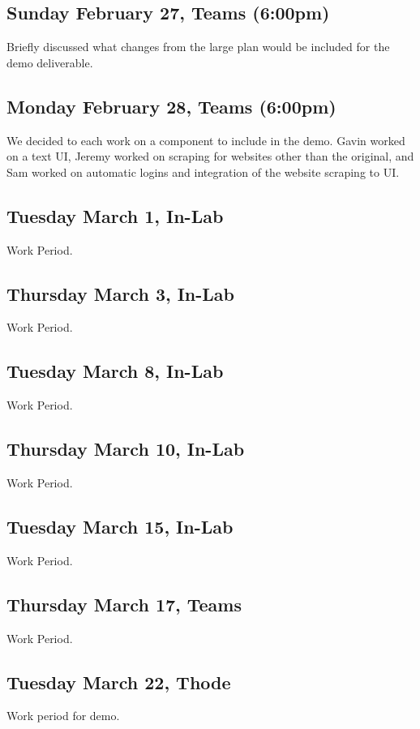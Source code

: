 \documentclass{article}
\begin{document}
\subsection{Sunday February 27, Teams (6:00pm)}
Briefly discussed what changes from the large plan would be included for the demo deliverable. 

\subsection{Monday February 28, Teams (6:00pm)}
We decided to each work on a component to include in the demo. Gavin worked on a text UI, Jeremy worked on scraping for websites other than the original, and Sam worked on automatic logins and integration of the website scraping to UI.

\subsection{Tuesday March 1, In-Lab}
Work Period. 

\subsection{Thursday March 3, In-Lab}
Work Period. 

\subsection{Tuesday March 8, In-Lab}
Work Period. 

\subsection{Thursday March 10, In-Lab}
Work Period. 

\subsection{Tuesday March 15, In-Lab}
Work Period. 

\subsection{Thursday March 17, Teams}
Work Period. 

\subsection{Tuesday March 22, Thode}
Work period for demo.
\end{document}
